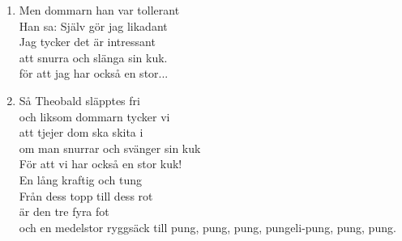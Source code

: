 \documentclass[twoside, openright]{report}
\begin{document}
\begin{enumerate}
\item Men dommarn han var tollerant\\
Han sa: Själv gör jag likadant\\
Jag tycker det är intressant\\
att snurra och slänga sin kuk.\\
för att jag har också en stor...

\item Så Theobald släpptes fri\\
och liksom dommarn tycker vi\\
att tjejer dom ska skita i\\
om man snurrar och svänger sin kuk\\
För att vi har också en stor kuk!\\
En lång kraftig och tung\\
Från dess topp till dess rot\\
är den tre fyra fot\\
och en medelstor ryggsäck till pung, pung, pung, pungeli-pung, pung, pung.

\end{enumerate}

\cleardoublepage
{}
\printindex
\end{document}
